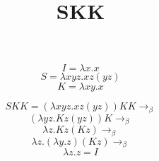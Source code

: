 \documentclass{article}
\title{SKK}
\begin{document}
\maketitle

\[I = \lambda x.x\]
\[S = \lambda xyz.x z (y z)\]
\[K = \lambda x y. x\]

\[S K K = (\lambda xyz.x z (y z)) K K \rightarrow_\beta\]
\[(\lambda yz.K z (y z))K \rightarrow_\beta\]
\[\lambda z.K z (K z) \rightarrow_\beta\]
\[\lambda z. (\lambda y.z)(K z) \rightarrow_\beta\]
\[\lambda z.z = I\]
\end{document}
